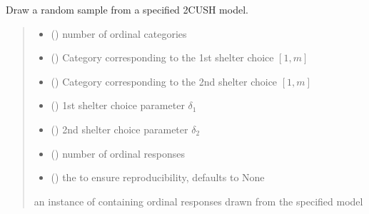 \documentclass[letterpaper,10pt,english]{sphinxmanual}
\begin{document}
\begin{fulllineitems}
\label{\detokenize{cubmods:cubmods.cush2.draw}}
\pysigstartsignatures
{}
\pysigstopsignatures
\sphinxAtStartPar
Draw a random sample from a specified 2\sphinxhyphen{}CUSH model.
\begin{quote}\begin{description}
\begin{itemize}
\item {} 
\sphinxAtStartPar
{} () \textendash{} number of ordinal categories

\item {} 
\sphinxAtStartPar
{} () \textendash{} Category corresponding to the 1st shelter choice \([1,m]\)

\item {} 
\sphinxAtStartPar
{} () \textendash{} Category corresponding to the 2nd shelter choice \([1,m]\)

\item {} 
\sphinxAtStartPar
{} () \textendash{} 1st shelter choice parameter \(\delta_1\)

\item {} 
\sphinxAtStartPar
{} () \textendash{} 2nd shelter choice parameter \(\delta_2\)

\item {} 
\sphinxAtStartPar
{} () \textendash{} number of ordinal responses

\item {} 
\sphinxAtStartPar
{} (\sphinxstyleliteralemphasis{\sphinxupquote{, }}) \textendash{} the  to ensure reproducibility, defaults to None

\end{itemize}

\sphinxAtStartPar
an instance of  containing ordinal responses drawn from the specified model

\end{description}\end{quote}

\end{fulllineitems}
\end{document}

